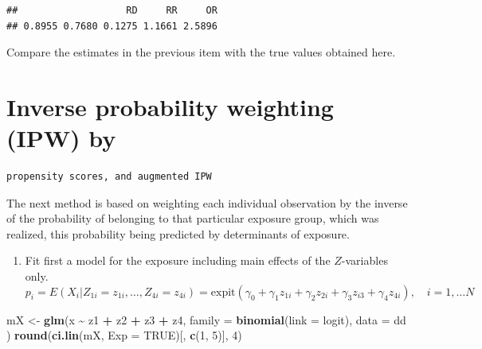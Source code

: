 \documentclass[
]{book}
\newenvironment{Shaded}{\begin{snugshade}}{\end{snugshade}}
\newcommand{\AttributeTok}[1]{\textcolor[rgb]{0.13,0.29,0.53}{#1}}
\newcommand{\ConstantTok}[1]{\textcolor[rgb]{0.56,0.35,0.01}{#1}}
\newcommand{\DecValTok}[1]{\textcolor[rgb]{0.00,0.00,0.81}{#1}}
\newcommand{\FunctionTok}[1]{\textcolor[rgb]{0.13,0.29,0.53}{\textbf{#1}}}
\newcommand{\NormalTok}[1]{#1}
\newcommand{\OtherTok}[1]{\textcolor[rgb]{0.56,0.35,0.01}{#1}}
\newcommand{\SpecialCharTok}[1]{\textcolor[rgb]{0.81,0.36,0.00}{\textbf{#1}}}
\providecommand{\tightlist}{%
  \setlength{\itemsep}{0pt}\setlength{\parskip}{0pt}}
\begin{document}
\begin{Shaded}
\end{Shaded}

\begin{verbatim}
##                   RD     RR     OR 
## 0.8955 0.7680 0.1275 1.1661 2.5896
\end{verbatim}

Compare the estimates in the previous item with the true values
obtained here.

\section{Inverse probability weighting (IPW) by}\label{inverse-probability-weighting-ipw-by}

\begin{verbatim}
propensity scores, and augmented IPW
\end{verbatim}

The next method is based on weighting each individual observation
by the inverse of the probability of belonging to that particular
exposure group, which was realized, this probability being predicted by
determinants of exposure.

\begin{enumerate}
\def\labelenumi{\arabic{enumi}.}
\tightlist
\item
  Fit first a model for the exposure including main effects
  of the \(Z\)-variables only.
  \[ 
  p_i = E(X_i| Z_{1i} = z_{1i}, \dots, Z_{4i} = z_{4i})
  = \text{expit}(\gamma_0 + \gamma_1 z_{1i} + \gamma_2 z_{2i} +
     \gamma_3 z_{i3} + \gamma_4 z_{4i} ), \quad i=1, \dots N 
  \]
\end{enumerate}

\begin{Shaded}
\begin{Highlighting}[]
\NormalTok{mX }\OtherTok{\textless{}{-}} \FunctionTok{glm}\NormalTok{(x }\SpecialCharTok{\textasciitilde{}}\NormalTok{ z1 }\SpecialCharTok{+}\NormalTok{ z2 }\SpecialCharTok{+}\NormalTok{ z3 }\SpecialCharTok{+}\NormalTok{ z4,}
  \AttributeTok{family =} \FunctionTok{binomial}\NormalTok{(}\AttributeTok{link =}\NormalTok{ logit), }\AttributeTok{data =}\NormalTok{ dd}
\NormalTok{)}
\FunctionTok{round}\NormalTok{(}\FunctionTok{ci.lin}\NormalTok{(mX, }\AttributeTok{Exp =} \ConstantTok{TRUE}\NormalTok{)[, }\FunctionTok{c}\NormalTok{(}\DecValTok{1}\NormalTok{, }\DecValTok{5}\NormalTok{)], }\DecValTok{4}\NormalTok{)}
\end{Highlighting}
\end{Shaded}
\end{document}
